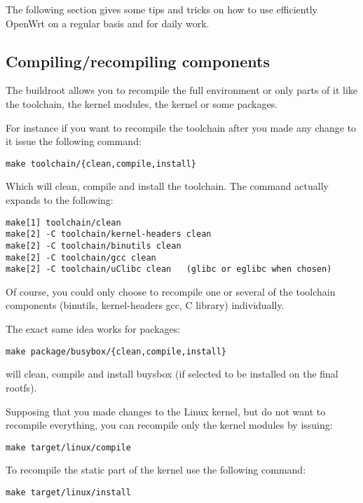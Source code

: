 The following section gives some tips and tricks on how to use efficiently
OpenWrt on a regular basis and for daily work.

\subsection{Compiling/recompiling components}

The buildroot allows you to recompile the full environment or only parts of it
like the toolchain, the kernel modules, the kernel or some packages.

For instance if you want to recompile the toolchain after you made any change to it
issue the following command:

\begin{Verbatim}
make toolchain/{clean,compile,install}
\end{Verbatim}

Which will clean, compile and install the toolchain. The command actually expands to the
following:

\begin{Verbatim}
make[1] toolchain/clean
make[2] -C toolchain/kernel-headers clean
make[2] -C toolchain/binutils clean
make[2] -C toolchain/gcc clean
make[2] -C toolchain/uClibc clean	(glibc or eglibc when chosen)
\end{Verbatim}

Of course, you could only choose to recompile one or several of the toolchain components
(binutils, kernel-headers gcc, C library) individually.

The exact same idea works for packages:

\begin{Verbatim}
make package/busybox/{clean,compile,install}
\end{Verbatim}

will clean, compile and install buysbox (if selected to be installed on the final rootfs).

Supposing that you made changes to the Linux kernel, but do not want to recompile everything,
you can recompile only the kernel modules by issuing:

\begin{Verbatim}
make target/linux/compile
\end{Verbatim}

To recompile the static part of the kernel use the following command:

\begin{Verbatim}
make target/linux/install
\end{Verbatim}

